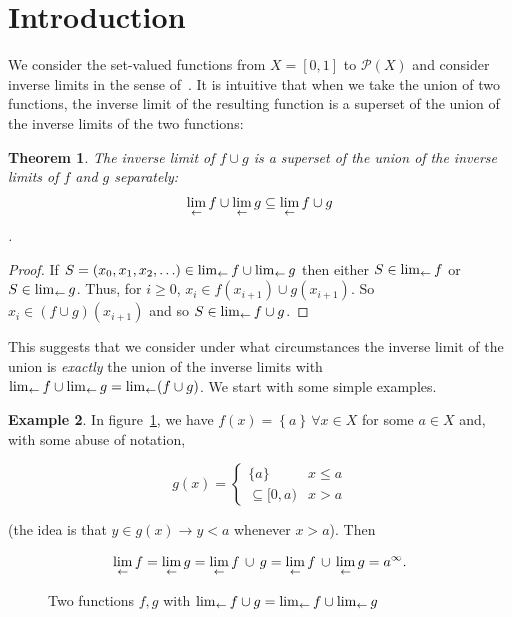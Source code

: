 \documentclass{article}
\newtheorem{thm}{Theorem}
\theoremstyle{definition}
\newtheorem{exam}[thm]{Example}
\begin{document}
\section{Introduction}

We consider the set-valued functions from $X=[0,1]$ to
$\mathcal{P}(X)$ and consider inverse limits in the sense
of~\cite{ingram2012,ingram2012a}.  It is intuitive that when we take
the union of two functions, the inverse limit of the resulting
function is a superset of the union of the inverse limits of the two
functions:

 \begin{thm}
The inverse limit of $f\cup g$ is a superset of the union of the
inverse limits of $f$ and $g$ separately: $$\lim_{\leftarrow} f \cup \lim_{\leftarrow} g
\subseteq\lim_{\leftarrow} f\cup g$$.
 \end{thm}
 \begin{proof}
If $S = (x_0, x_1, x_2, \ldots)\in\lim_{\leftarrow} f\cup\lim_{\leftarrow} g$ then
either $S\in\lim_{\leftarrow} f$ or $S\in\lim_{\leftarrow} g$.  Thus, for $i\geqslant
0$, $x_i\in f(x_{i+1})\cup g(x_{i+1})$.  So $x_i \in ( f \cup g
)(x_{i+1})$ and so $S\in\lim_{\leftarrow} f\cup g$.
 \end{proof}

This suggests that we consider under what circumstances the inverse
limit of the union is {\em exactly} the union of the inverse limits
with $\lim_{\leftarrow} f\cup\lim_{\leftarrow} g = \lim_{\leftarrow} (f\cup g)$.  We start with
some simple examples.

\begin{exam}
In figure~\ref{abuse}, we have $f(x)=\left\lbrace
a\right\rbrace\,\forall x\in X$ for some $a\in X$ and, with some abuse
of notation,

\begin{equation}
  g(x) = \begin{cases}
    \lbrace a\rbrace & x\leqslant a\\
    \subseteq[0,a) & x>a
    \end{cases}
\end{equation}

(the idea is that $y\in g(x)\longrightarrow y<a$ whenever $x>a$). Then

\begin{equation}
\lim_{\leftarrow} f = \lim_{\leftarrow} g =  \lim_{\leftarrow} f \, \cup\, g = \lim_{\leftarrow} f \,\cup\,
\lim_{\leftarrow} g = a^\infty.
\end{equation}
\end{exam}

\begin{figure}[h]
\caption{Two \label{abuse} functions $f,g$ with $\lim_{\leftarrow} f\cup g=\lim_{\leftarrow} f\cup\lim_{\leftarrow} g$}
\end{figure}
\end{document}
